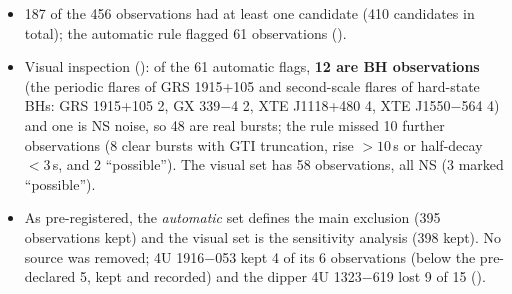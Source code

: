 \begin{itemize}
\item 187 of the 456 observations had at least one candidate (410 candidates in total); the automatic rule flagged 61
observations ().
\item Visual inspection (): of the 61 automatic flags, \textbf{12 are BH observations}
(the periodic flares of GRS 1915+105 and second-scale flares of hard-state BHs: GRS 1915+105 2, GX 339$-$4 2,
XTE J1118+480 4, XTE J1550$-$564 4) and one is NS noise, so 48 are real bursts; the rule missed 10 further observations
(8 clear bursts with GTI truncation, rise $>10$\,s or half-decay $<3$\,s, and 2 ``possible''). The visual set has 58
observations, all NS (3 marked ``possible'').
\item As pre-registered, the \emph{automatic} set defines the main exclusion (395 observations kept) and the visual set is
the sensitivity analysis (398 kept). No source was removed; 4U 1916$-$053 kept 4 of its 6 observations (below the
pre-declared 5, kept and recorded) and the dipper 4U 1323$-$619 lost 9 of 15 ().
\end{itemize}

